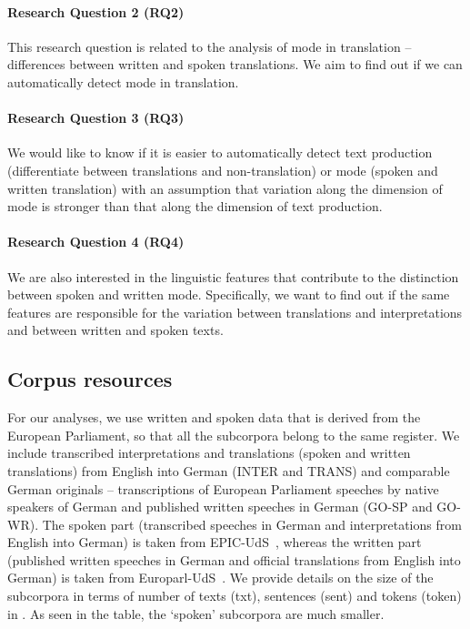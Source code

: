 \documentclass[output=paper,colorlinks,citecolor=brown]{langscibook}
\begin{document}
\paragraph*{Research Question 2 (RQ2)} This research question is related to the analysis of mode in translation -- differences between written and spoken translations. We aim to find out if we can automatically detect mode in translation.

\paragraph*{Research Question 3 (RQ3)} %
We would like to know if it is easier to automatically detect text production (differentiate between translations and non-trans\-la\-tion) or mode (spoken and written translation) with an assumption that variation along the dimension of mode is stronger than that along the dimension of text production.

\paragraph*{Research Question 4 (RQ4)} %
We are also interested in the linguistic features that contribute to the distinction between spoken and written mode. Specifically, we want to find out if the same features are responsible for the variation between translations and interpretations and between written and spoken texts.

\subsection{Corpus resources}\label{ssec:corpora}
For our analyses, we use written and spoken data that is derived from the European Parliament, so that all the subcorpora belong to the same register.  %
We include transcribed interpretations and translations (spoken and written translations) from English into German (INTER and TRANS) and comparable German originals -- transcriptions of European Parliament speeches by native speakers of German and published written speeches in German (GO-SP and GO-WR). The spoken part (transcribed speeches in German and interpretations from English into German) is taken from EPIC-UdS~\citep{KarakantaEtAl2019}, whereas the written part (published written speeches in German and official translations from English into German) is taken from Europarl-UdS~\citep{KarakantaEtAl2018}. We provide details on the size of the subcorpora in terms of number of texts (txt), sentences (sent) and tokens (token) in .
As seen in the table, the `spoken' subcorpora %
are much smaller.
\end{document}
